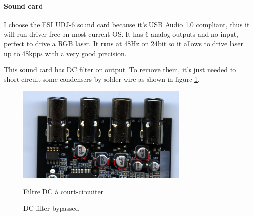 \begin{en}
\paragraph*{Sound card}
I choose the ESI UDJ-6 sound card because it's USB Audio 1.0 compliant, thus it will run driver free on most current OS.
It has 6 analog outputs and no input, perfect to drive a RGB laser.
It runs at 48\unit{Hz} on 24\unit{bit} so it allows to drive laser up to 48\unit{kpps} with a very good precision.

This sound card has DC filter on output.
To remove them, it's just needed to short circuit some condensers by solder wire as shown in figure \ref{strap_DC}.
\end{en}

\begin{figure}[ht]
\begin{center}
\includegraphics[width=0.75\textwidth]{images/strap_dc_removal.jpg} 
\end{center}
\begin{fr}
\caption{Filtre DC à court-circuiter}
\end{fr}
\begin{en}
\caption{DC filter bypassed}
\end{en}
\label{strap_DC}
\end{figure}

